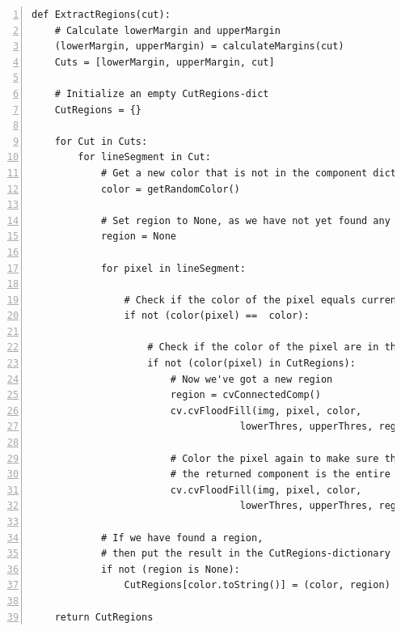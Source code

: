 {\begin{lstlisting}[caption={Pseudokode til udtrækning af regioner med
    margin.},captionpos=b,label={pseudo_udtraek_margin},numbers=left,
    frame=tb, breaklines=false, float=h]
def ExtractRegions(cut):
    # Calculate lowerMargin and upperMargin
    (lowerMargin, upperMargin) = calculateMargins(cut)
    Cuts = [lowerMargin, upperMargin, cut]

    # Initialize an empty CutRegions-dict
    CutRegions = {}

    for Cut in Cuts:
        for lineSegment in Cut:
            # Get a new color that is not in the component dictionary
            color = getRandomColor()

            # Set region to None, as we have not yet found any
            region = None

            for pixel in lineSegment:

                # Check if the color of the pixel equals current color
                if not (color(pixel) ==  color):

                    # Check if the color of the pixel are in the saved regions
                    if not (color(pixel) in CutRegions):
                        # Now we've got a new region
                        region = cvConnectedComp()
                        cv.cvFloodFill(img, pixel, color,
                                    lowerThres, upperThres, region)

                        # Color the pixel again to make sure that
                        # the returned component is the entire region
                        cv.cvFloodFill(img, pixel, color,
                                    lowerThres, upperThres, region)

            # If we have found a region,
            # then put the result in the CutRegions-dictionary
            if not (region is None):
                CutRegions[color.toString()] = (color, region)

    return CutRegions
\end{lstlisting}

}
